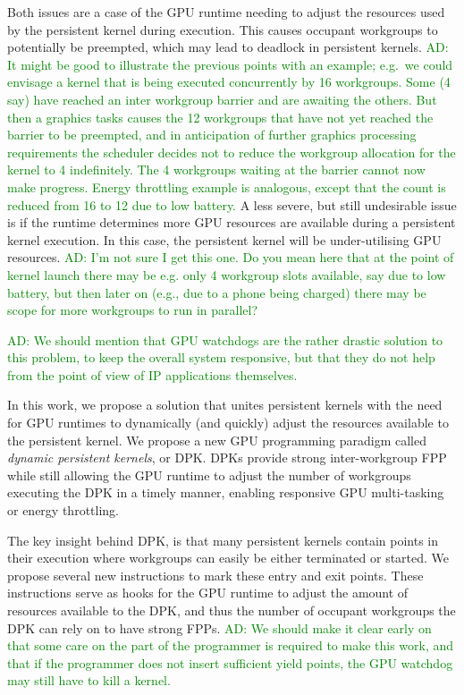 \documentclass[nocopyrightspace]{sigplanconf-pldi16}
\newcommand{\ADComment}[1]{\textcolor{green}{AD: #1}}
\begin{document}
Both issues are a case of the GPU runtime needing to adjust the
resources used by the persistent kernel during execution. This causes
occupant workgroups to potentially be preempted, which may lead to
deadlock in persistent kernels. \ADComment{It might be good to illustrate the previous points with an example; e.g.\ we could envisage a kernel that is being executed concurrently by 16 workgroups.  Some (4 say) have reached an inter workgroup barrier and are awaiting the others.  But then a graphics tasks causes the 12 workgroups that have not yet reached the barrier to be preempted, and in anticipation of further graphics processing requirements the scheduler decides not to reduce the workgroup allocation for the kernel to 4 indefinitely.  The 4 workgroups waiting at the barrier cannot now make progress.  Energy throttling example is analogous, except that the count is reduced from 16 to 12 due to low battery.}
A less severe, but still undesirable
issue is if the runtime determines more GPU resources are available
during a persistent kernel execution. In this case, the persistent
kernel will be under-utilising GPU resources. \ADComment{I'm not sure I get this one.  Do you mean here that at the point of kernel launch there may be e.g. only 4 workgroup slots available, say due to low battery, but then later on (e.g., due to a phone being charged) there may be scope for more workgroups to run in parallel?}

\ADComment{We should mention that GPU watchdogs are the rather drastic solution to this problem, to keep the overall system responsive, but that they do not help from the point of view of IP applications themselves.}

In this work, we propose a solution that unites persistent kernels
with the need for GPU runtimes to dynamically (and quickly) adjust the
resources available to the persistent kernel. We propose a new GPU
programming paradigm called \emph{dynamic persistent kernels}, or
DPK. DPKs provide strong inter-workgroup FPP while still allowing the
GPU runtime to adjust the number of workgroups executing the DPK in a
timely manner, enabling responsive GPU multi-tasking or energy
throttling.

The key insight behind DPK, is that many persistent kernels contain
points in their execution where workgroups can easily be either
terminated or started. We propose several new instructions to mark
these entry and exit points. These instructions serve as hooks for the
GPU runtime to adjust the amount of resources available to the DPK,
and thus the number of occupant workgroups the DPK can rely on to have
strong FPPs. \ADComment{We should make it clear early on that some care on the part of the programmer is required to make this work, and that if the programmer does not insert sufficient yield points, the GPU watchdog may still have to kill a kernel.}
\end{document}
